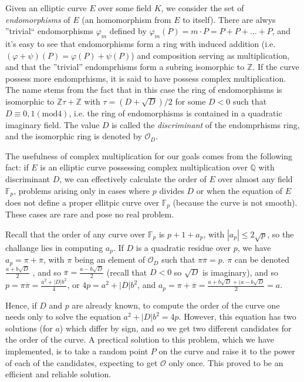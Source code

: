 \documentclass[11pt,english]{article}
\begin{document}
Given an elliptic curve $E$ over some field $K$, we consider the set of \emph{endomorphisms} of $E$ (an homomorphism from $E$ to itself). There are
alwys ''trivial`` endomorphisms $\varphi_m$ defined by $\varphi_m(P)=m\cdot P=P+P+\dots+P$, and it's easy to see that endomorphisms form a ring
with induced addition (i.e. $(\varphi+\psi)(P)=\varphi(P)+\psi(P)$) and composition serving as multiplication, and that the ''trivial'' endomprhisms form a subring
isomorphic to $\mathbb{Z}$. If the curve possess more endomprhisms, it is said to have possess complex multiplication. The name stems from
the fact that in this case the ring of endomorphisms is isomorphic to $\mathbb{Z}\tau+\mathbb{Z}$ with $\tau = (D+\sqrt{D})/2$ for some $D<0$
such that $D\equiv 0,1 (\mathrm{mod }4)$, i.e. the ring of endomorphisms is contained in a quadratic imaginary field. The value $D$ is called the \emph{discriminant} of the
endomprhisms ring, and the isomorphic ring is denoted by $\mathcal{O}_D$.

The usefulness of complex multiplication for our goals comes from the following fact: if $E$ is an elliptic curve possessing complex multiplication over $\mathbb{Q}$
with discriminant $D$, we can effectively calculate the order of $E$ over almost any field $\mathbb{F}_p$, problems arising only in cases where $p$ divides $D$ or
when the equation of $E$ does not define a proper ellitpic curve over $\mathbb{F}_p$ (because the curve is not smooth). These cases are rare and
pose no real problem.

Recall that the order of any curve over $\mathbb{F}_p$ is $p+1+a_p$, with $|a_p|\le2\sqrt{p}$, so the challange lies in computing $a_p$. If $D$ is
a quadratic residue over $p$, we have $a_p=\pi+\overline{\pi}$, with $\pi$ being an element of $\mathcal{O}_D$ such that $\pi\overline{\pi}=p$.
$\pi$ can be denoted $\frac{a+b\sqrt{D}}{2}$ , and so $\overline{\pi}=\frac{a-b\sqrt{D}}{2}$ (recall that $D<0$ so $\sqrt{D}$ is imaginary),
and so $p=\pi\overline{\pi}=\frac{a^2+|D|b^2}{4}$, or $4p=a^2+|D|b^2$, and  $a_p=\pi+\overline{\pi}=\frac{a+b\sqrt{D}+(a-b\sqrt{D}}{2}=a$.

Hence, if $D$ and $p$ are already known, to compute the order of the curve one needs only to solve the equation $a^2+|D|b^2=4p$. However, this equation
has two solutions (for $a$) which differ by sign, and so we get two different candidates for the order of the curve. A prectical solution to this problem, which
we have implemented, is to take a random point $P$ on the curve and raise it to the power of each of the candidates, expecting to get $\mathcal{O}$ only
once. This proved to be an efficient and reliable solution.
\end{document}

